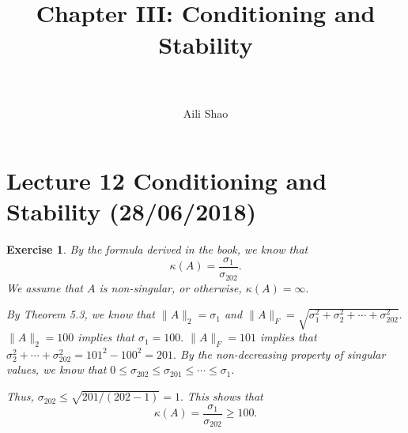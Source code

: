 \documentclass[paper=a4, fontsize=11pt]{scrartcl} %
\title{	
\normalfont \normalsize 
%
\horrule{0.5pt} \\[0.4cm] %
\huge Chapter III:  Conditioning and Stability   \\ %
\horrule{2pt} \\[0.5cm] %
}
\date{}
\author{Aili Shao}
\numberwithin{equation}{section} %
\numberwithin{figure}{section} %
\numberwithin{table}{section} %
\newtheorem{exercise}{Exercise}
\numberwithin{exercise}{section}
\begin{document}
\maketitle %

\section{Lecture 12 Conditioning and Stability (28/06/2018)}

\begin{exercise}

By the formula derived in the book, we know that 
$$\kappa(A)=\frac{\sigma_1}{\sigma_{202}}.$$
We assume that $A$ is non-singular, or otherwise, $\kappa(A)=\infty.$

By Theorem 5.3, we know that 
$\|A\|_{2}=\sigma_1$ and $\|A\|_{F}=\sqrt{\sigma_{1}^2+\sigma_{2}^2+\cdots +\sigma_{202}^2}.$
$\|A\|_{2}=100$ implies that $\sigma_1=100.$
$\|A\|_{F}=101$ implies that $\sigma_{2}^2+\cdots+\sigma_{202}^2=101^2-100^2=201.$ By the non-decreasing property of singular values, we know that 
$0\leq \sigma_{202}\leq \sigma_{201} \leq \cdots \leq \sigma_{1}.$

Thus, $\sigma_{202}\leq \sqrt{201/(202-1)}=1.$ This shows that 
$$\kappa(A)=\frac{\sigma_1}{\sigma_{202}}\geq 100.$$
\end{exercise}
\end{document}
